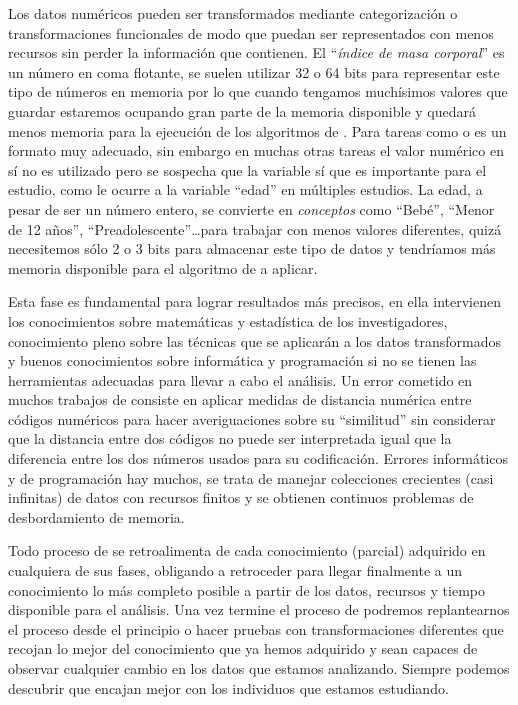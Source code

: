 Los datos numéricos pueden ser transformados mediante categorización o transformaciones funcionales de modo que puedan ser representados con menos recursos sin perder la información que contienen. El "`\emph{índice de masa corporal}"' es un número en coma flotante, se suelen utilizar 32 o 64 bits para representar este tipo de números en memoria por lo que cuando tengamos muchísimos valores que guardar estaremos ocupando gran parte de la memoria disponible y quedará menos memoria para la ejecución de los algoritmos de \DM. Para tareas como \regresion o \clustering es un formato muy adecuado, sin embargo en muchas otras tareas el valor numérico en sí no es utilizado pero se sospecha que la variable sí que es importante para el estudio, como le ocurre a la variable "`edad"' en múltiples estudios. La edad, a pesar de ser un número entero, se convierte en \emph{conceptos} como "`Bebé"', "`Menor de 12 años"', "`Preadolescente"'\ldots para trabajar con menos valores diferentes, quizá necesitemos sólo 2 o 3 bits para almacenar este tipo de datos y tendríamos más memoria disponible para el algoritmo de \DM a aplicar.

Esta fase es fundamental para lograr resultados más precisos, en ella intervienen los conocimientos sobre matemáticas y estadística de los investigadores, conocimiento pleno sobre las técnicas que se aplicarán a los datos transformados y buenos conocimientos sobre informática y programación si no se tienen las herramientas adecuadas para llevar a cabo el análisis. Un error cometido en muchos trabajos de \clustering consiste en aplicar medidas de distancia numérica entre códigos numéricos para hacer averiguaciones sobre su "`similitud"' sin considerar que la distancia entre dos códigos no puede ser interpretada igual que la diferencia entre los dos números usados para su codificación. Errores informáticos y de programación hay muchos, se trata de manejar colecciones crecientes (casi infinitas) de datos con recursos finitos y se obtienen continuos problemas de desbordamiento de memoria.

Todo proceso de \KDD se retroalimenta de cada conocimiento (parcial) adquirido en cualquiera de sus fases, obligando a retroceder para llegar finalmente a un conocimiento lo más completo posible a partir de los datos, recursos y tiempo disponible para el análisis. Una vez termine el proceso de \KDD podremos replantearnos el proceso desde el principio o hacer pruebas con transformaciones diferentes que recojan lo mejor del conocimiento que ya hemos adquirido y sean capaces de observar cualquier cambio en los datos que estamos analizando. Siempre podemos descubrir \patrones que encajan mejor con los individuos que estamos estudiando.

